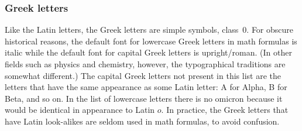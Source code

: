 \subsubsection{Greek letters}
Like the Latin letters, the Greek letters are simple symbols, class~0.
For obscure historical reasons, the default font for lowercase Greek
letters in math formulas is italic while the default font for capital
Greek letters is upright/roman. (In other fields such as physics and
chemistry, however, the typographical traditions are somewhat
different.) The capital Greek letters not present in this list are the
letters that have the same appearance as some Latin letter: A for Alpha,
B for Beta, and so on. In the list of lowercase letters there is no
omicron because it would be identical in appearance to Latin $o$. In
practice, the Greek letters that have Latin look-alikes are seldom used
in math formulas, to avoid confusion.
\begin{symlist}[adjustheight=12pt]
\newcolumn
{}
\newcolumn
{}
\newcolumn
{}
\end{symlist}

